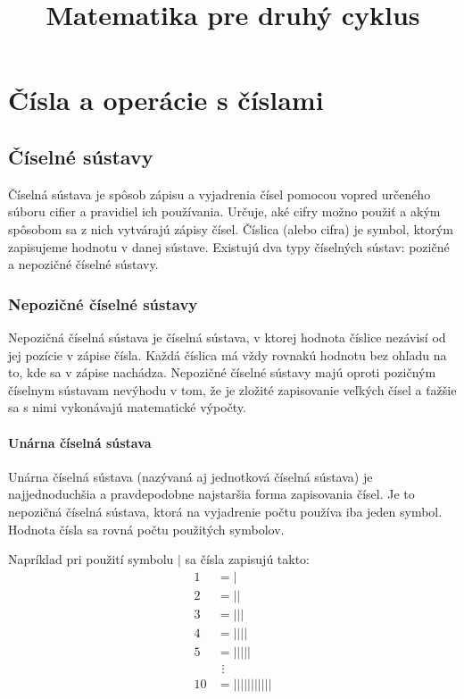 \documentclass{report}
\title{Matematika pre druhý cyklus}
\begin{document}
\maketitle

\part{Čísla a operácie s číslami}

\chapter{Číselné sústavy}

Číselná sústava je spôsob zápisu a vyjadrenia čísel pomocou vopred určeného súboru cifier a pravidiel ich používania. Určuje, aké cifry možno použiť a akým spôsobom sa z nich vytvárajú zápisy čísel. Číslica (alebo cifra) je symbol, ktorým zapisujeme hodnotu v danej sústave. Existujú dva typy číselných sústav: pozičné a nepozičné číselné sústavy.

\section{Nepozičné číselné sústavy}

Nepozičná číselná sústava je číselná sústava, v ktorej hodnota číslice nezávisí od jej pozície v zápise čísla. Každá číslica má vždy rovnakú hodnotu bez ohľadu na to, kde sa v zápise nachádza. Nepozičné číselné sústavy majú oproti pozičným číselnym sústavam nevýhodu v tom, že je zložité zapisovanie veľkých čísel a ťažšie sa s nimi vykonávajú matematické výpočty.

\subsection{Unárna číselná sústava}

Unárna číselná sústava (nazývaná aj jednotková číselná sústava) je najjednoduchšia a pravdepodobne najstaršia forma zapisovania čísel. Je to nepozičná číselná sústava, ktorá na vyjadrenie počtu používa iba jeden symbol. Hodnota čísla sa rovná počtu použitých symbolov.

Napríklad pri použití symbolu $\vert$ sa čísla zapisujú takto:
\[
\begin{aligned}
  1 &= \vert \\
  2 &= \vert \vert \\
  3 &= \vert \vert \vert \\ 
  4 &= \vert \vert \vert \vert \\
  5 &= \vert \vert \vert \vert \vert \\
  & \hspace{5pt} \vdots \\
  10 &= \vert \vert \vert \vert \vert \vert \vert \vert \vert \vert \vert \\
\end{aligned}
\]
\end{document}
